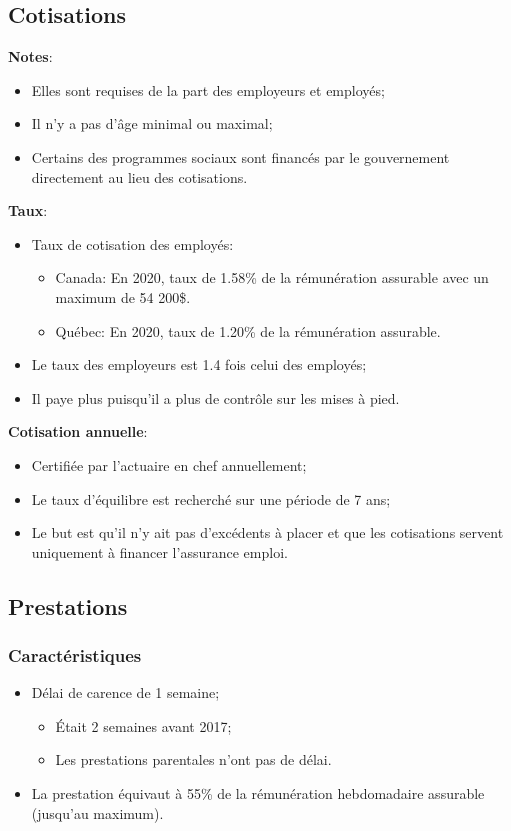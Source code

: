 \documentclass[10pt, french]{article}
\begin{document}
\begin{multicols*}{3}
\subsection*{Cotisations}
\textbf{Notes}:
\begin{itemize}[leftmargin = *]
	\item	Elles sont requises de la part des employeurs et employés;
	\item	Il n'y a pas d'âge minimal ou maximal;
	\item	Certains des programmes sociaux sont financés par le gouvernement directement au lieu des cotisations.
\end{itemize}

\textbf{Taux}:
\begin{itemize}[leftmargin = *]
	\item	Taux de cotisation des employés:
		\begin{itemize}[leftmargin = *]
		\item	\textcolor{bulgarianrose}{Canada}:  En 2020, taux de 1.58\% de la rémunération assurable avec un maximum de 54 200\$.
		\item	\textcolor{blue(pigment)}{Québec}:  En 2020, taux de 1.20\% de la rémunération assurable.
		\end{itemize}
	\item	Le taux des employeurs est 1.4 fois celui des employés;
	\item	Il paye plus puisqu'il a plus de contrôle sur les mises à pied.
\end{itemize}

\textbf{Cotisation annuelle}:
\begin{itemize}[leftmargin = *]
	\item	Certifiée par l'actuaire en chef annuellement;
	\item	Le taux d'équilibre est recherché sur une période de 7 ans;
	\item	Le but est qu'il n'y ait pas d'excédents à placer et que les cotisations servent uniquement à financer l'assurance emploi.
\end{itemize}


\subsection*{Prestations}

\subsubsection*{Caractéristiques}
\begin{itemize}[leftmargin = *]
	\item	Délai de carence de 1 semaine;
		\begin{itemize}[leftmargin = *]
		\item	Était 2 semaines avant 2017;
		\item	Les prestations parentales n'ont pas de délai.
		\end{itemize}
	\item	La prestation équivaut à 55\% de la rémunération hebdomadaire assurable (jusqu'au maximum).
\end{itemize}


\end{multicols*}
\end{document}

